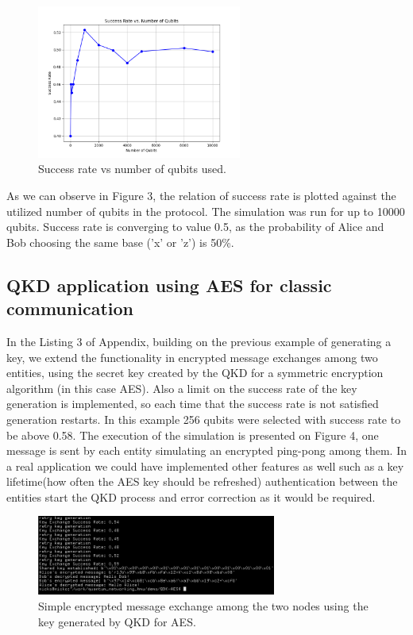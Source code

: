 \documentclass[12pt]{ieeetj}
\begin{document}
		\begin{figure}[H]
			\centering
			\includegraphics[width=0.6\textwidth]{bb84/success_rate_vs_num_qubits.png}
			\caption{Success rate vs number of qubits used.}
			\label{fig3:}
		\end{figure}		

		As we can observe in Figure 3, the relation of success rate is plotted against the utilized 
		number of qubits in the protocol. The simulation was run for up to 10000 qubits. 
		Success rate is converging to value 0.5, as the probability 
		of Alice and Bob choosing the same base ('x' or 'z') is 50\%.


		\subsection{QKD application using AES for classic communication}

		In the Listing 3 of Appendix, building on the previous example of generating a key,
		we extend the functionality in encrypted message exchanges among two entities, using the secret key created
		by the QKD for a symmetric encryption algorithm (in this case AES). 
		Also a limit on the success rate of the key generation is implemented,
		so each time that the success rate is not satisfied
		generation restarts. In this example 256 qubits were selected with success rate to be above 0.58.
		The execution of the simulation is presented on Figure 4, one message is sent by each entity simulating
		an encrypted ping-pong among them. In a real application we could have implemented 
		other features as well such as a key lifetime(how often the AES key should be refreshed)
		authentication between the entities start the QKD process and error correction as it would be required.
		
		\begin{figure}[H]
			\centering
			\includegraphics[width=0.7\textwidth]{qkd_aes/app.png}
			\caption{Simple encrypted message exchange among the two nodes using the key generated by QKD for AES.}
			\label{fig4:}
		\end{figure}		
\end{document}
